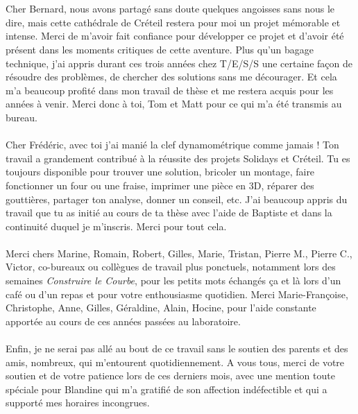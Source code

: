\\
\\
Cher Bernard, nous avons partagé sans doute quelques angoisses sans nous le dire, mais cette cathédrale de Créteil restera pour moi un projet mémorable et intense. Merci de m'avoir fait confiance pour développer ce projet et d'avoir été présent dans les moments critiques de cette aventure. Plus qu'un bagage technique, j'ai appris durant ces trois années chez T/E/S/S une certaine façon de résoudre des problèmes, de chercher des solutions sans me décourager. Et cela m'a beaucoup profité dans mon travail de thèse et me restera acquis pour les années à venir. Merci donc à toi, Tom et Matt pour ce qui m'a été transmis au bureau.
\\
\\
Cher Frédéric, avec toi j'ai manié la clef dynamométrique comme jamais ! Ton travail a grandement contribué à la réussite des projets Solidays et Créteil. Tu es toujours disponible pour trouver une solution, bricoler un montage, faire fonctionner un four ou une fraise, imprimer une pièce en 3D, réparer des gouttières, partager ton analyse, donner un conseil, etc. J'ai beaucoup appris du travail que tu as initié au cours de ta thèse avec l'aide de Baptiste et dans la continuité duquel je m'inscris. Merci pour tout cela.
\\
\\
Merci chers Marine, Romain, Robert, Gilles, Marie, Tristan, Pierre M., Pierre C., Victor, \telp{} co-bureaux ou collègues de travail plus ponctuels, notamment lors des semaines \emph{Construire le Courbe}, pour les petits mots échangés ça et là lors d'un café ou d'un repas et pour votre enthousiasme quotidien. Merci Marie-Françoise, Christophe, Anne, Gilles, Géraldine, Alain, Hocine, pour l'aide constante apportée au cours de ces années passées au laboratoire.
\\
\\
Enfin, je ne serai pas allé au bout de ce travail sans le soutien des parents et des amis, nombreux, qui m'entourent quotidiennement. A vous tous, merci de votre soutien et de votre patience lors de ces derniers mois, avec une mention toute spéciale pour Blandine qui m'a gratifié de son affection indéfectible et qui a supporté mes horaires incongrues.











